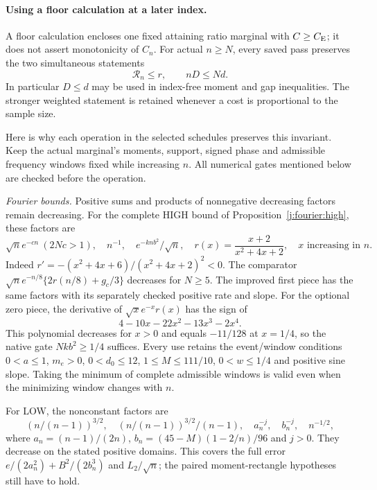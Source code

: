 \paragraph{Using a floor calculation at a later index.}
\label{j:local:transfer}
A floor calculation encloses one fixed attaining ratio marginal with
$C\ge C_{\mathrm E}$; it does not assert monotonicity of $C_n$. For actual
$n\ge N$, every saved pass
preserves the two simultaneous statements
\begin{equation}\label{j:local:ext:floor-invariant}
 \mathcal R_n\le r,\qquad nD\le Nd.
\end{equation}
In particular $D\le d$ may be used in index-free moment and gap
inequalities. The stronger weighted statement is retained whenever a
cost is proportional to the sample size.

Here is why each operation in the selected schedules preserves this
invariant. Keep the actual marginal's moments, support, signed phase
and admissible frequency windows fixed while increasing $n$.
All numerical gates mentioned below are checked before the operation.

\emph{Fourier bounds.} Positive sums and products of nonnegative
decreasing factors remain decreasing. For the complete HIGH bound
of Proposition~\ref{j:fourier:high}, these factors are
\[
 \sqrt n e^{-cn}\ (2Nc>1),\quad n^{-1},\quad
 e^{-knb^2}/\sqrt n,\quad
 r(x)=\frac{x+2}{x^2+4x+2},\quad x\text{ increasing in }n.
\]
Indeed $r'=-(x^2+4x+6)/(x^2+4x+2)^2<0$.
The comparator $\sqrt n e^{-n/8}\{2r(n/8)+g_c/3\}$ decreases
for $N\ge5$. The improved first piece has the same factors with
its separately checked positive rate and slope. For the optional zero
piece, the derivative of $\sqrt{x}e^{-x}r(x)$ has the sign of
\[
 4-10x-22x^2-13x^3-2x^4.
\]
This polynomial decreases for $x>0$ and equals $-11/128$ at
$x=1/4$, so the native gate $Nkb^2\ge1/4$ suffices. Every use
retains the event/window conditions $0<a\le1$, $m_e>0$,
$0<d_0\le12$, $1\le M\le111/10$, $0<w\le1/4$ and positive
sine slope. Taking the minimum of complete admissible windows is
valid even when the minimizing window changes with $n$.

For LOW, the nonconstant factors are
\[
 (n/(n-1))^{3/2},\quad (n/(n-1))^{3/2}/(n-1),\quad
 a_n^{-j},\quad b_n^{-j},\quad n^{-1/2},
\]
where $a_n=(n-1)/(2n)$, $b_n=(45-M)(1-2/n)/96$ and $j>0$.
They decrease on the stated positive domains. This covers the full
error $e/(2a_n^2)+B^2/(2b_n^3)$ and $L_2/\sqrt n$; the paired
moment-rectangle hypotheses still have to hold.

